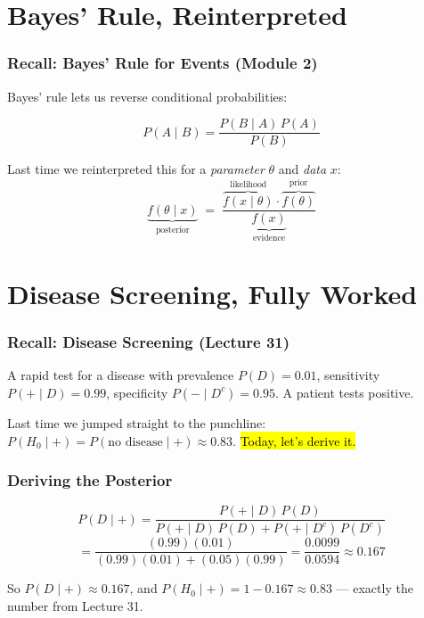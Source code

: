 \documentclass[slidestop,compress,mathserif]{beamer}
\begin{document}

\section{Bayes' Rule, Reinterpreted}

\begin{frame}
    \frametitle{Recall: Bayes' Rule for Events (Module 2)}
    Bayes' rule lets us reverse conditional probabilities:
    
    \[
    P(A \mid B) = \frac{P(B \mid A)\, P(A)}{P(B)}
    \]
    \pause

    Last time we reinterpreted this for a \emph{parameter} $\theta$ and \emph{data} $x$:
    \[
    \underbrace{f(\theta \mid x)}_{\text{posterior}} \;=\; \frac{\overbrace{f(x\mid\theta)}^{\text{likelihood}} \cdot \overbrace{f(\theta)}^{\text{prior}}}{\underbrace{f(x)}_{\text{evidence}}} 
    \]

\end{frame}


\section{Disease Screening, Fully Worked}

\begin{frame}
    \frametitle{Recall: Disease Screening (Lecture 31)}
    A rapid test for a disease with prevalence $P(D) = 0.01$, sensitivity $P(+\mid D)=0.99$, specificity $P(-\mid D^c)=0.95$. A patient tests positive.
    \pause

    \medskip
    Last time we jumped straight to the punchline: $P(H_0\mid +) = P(\text{no disease}\mid +) \approx 0.83$. \hl{Today, let's derive it.}
\end{frame}

\begin{frame}
    \frametitle{Deriving the Posterior}
    \[
    P(D \mid +) = \frac{P(+\mid D)\,P(D)}{P(+\mid D)\,P(D) + P(+\mid D^c)\,P(D^c)}
    \]
    \pause
    \[
    = \frac{(0.99)(0.01)}{(0.99)(0.01) + (0.05)(0.99)} = \frac{0.0099}{0.0594} \approx 0.167
    \]
    \pause

    \medskip
    So $P(D\mid +) \approx 0.167$, and $P(H_0 \mid +) = 1 - 0.167 \approx 0.83$ --- exactly the number from Lecture 31.
\end{frame}
\end{document}
